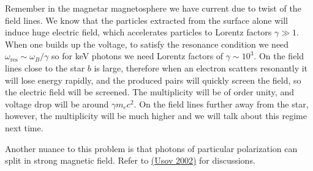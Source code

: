 \documentclass[letterpaper, 11pt]{article}
\numberwithin{equation}{section}
\numberwithin{figure}{section}
\begin{document}
Remember in the magnetar magnetosphere we have current due to twist of the field lines. We know that the particles extracted from the surface alone will induce huge electric field, which accelerates particles to Lorentz factors $\gamma \gg 1$. When one builds up the voltage, to satisfy the resonance condition we need $\omega_\mathrm{res} \sim \omega_B/\gamma$ so for keV photons we need Lorentz factors of $\gamma \sim 10^3$. On the field lines close to the star $b$ is large, therefore when an electron scatters resonantly it will lose energy rapidly, and the produced pairs will quickly screen the field, so the electric field will be screened. The multiplicity will be of order unity, and voltage drop will be around $\gamma m_ec^2$. On the field lines further away from the star, however, the multiplicity will be much higher and we will talk about this regime next time.

Another nuance to this problem is that photons of particular polarization can split in strong magnetic field. Refer to \href{http://adsabs.harvard.edu/abs/2002ApJ...572L..87U}{(Usov 2002)} for discussions.
\end{document}
